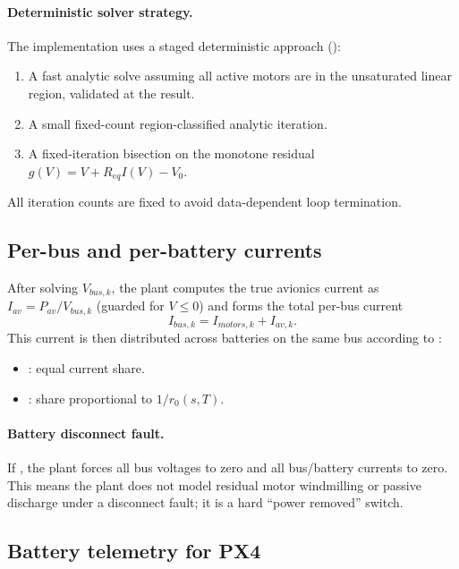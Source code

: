 \paragraph{Deterministic solver strategy.}
The implementation uses a staged deterministic approach ():
\begin{enumerate}[leftmargin=*,itemsep=2pt]
  \item A fast analytic solve assuming all active motors are in the unsaturated linear region, validated at the result.
  \item A small fixed-count region-classified analytic iteration.
  \item A fixed-iteration bisection on the monotone residual $g(V)=V+R_{eq}I(V)-V_0$.
\end{enumerate}
All iteration counts are fixed to avoid data-dependent loop termination.

\subsection{Per-bus and per-battery currents}
\label{sec:current-share}

After solving $V_{bus,k}$, the plant computes the true avionics current as $I_{av}=P_{av}/V_{bus,k}$ (guarded for $V\le 0$) and forms the total per-bus current
\begin{equation}
  I_{bus,k} = I_{motors,k} + I_{av,k}.
\end{equation}
This current is then distributed across batteries on the same bus according to :
\begin{itemize}[leftmargin=*,itemsep=2pt]
  \item {}: equal current share.
  \item {}: share proportional to $1/r_0(s,T)$.
\end{itemize}

\paragraph{Battery disconnect fault.}
If , the plant forces all bus voltages to zero and all bus/battery currents to zero. This means the plant does not model residual motor windmilling or passive discharge under a disconnect fault; it is a hard ``power removed'' switch.

\subsection{Battery telemetry for PX4}

